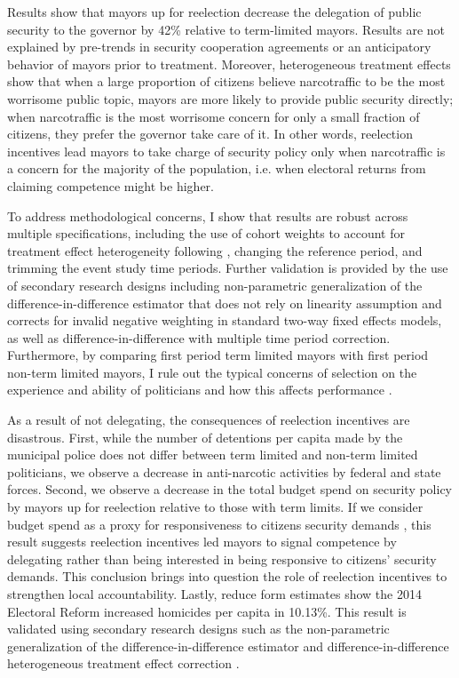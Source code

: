 \documentclass[12pt]{amsart}
\numberwithin{equation}{section}
\theoremstyle{definition}
\theoremstyle{definition}
\theoremstyle{definition}
\begin{document}
Results show that mayors up for reelection decrease the delegation of public security to the governor by 42\% relative to term-limited mayors. Results are not explained by pre-trends in security cooperation agreements or an anticipatory behavior of mayors prior to treatment. Moreover, heterogeneous treatment effects show that when a large proportion of citizens believe narcotraffic to be the most worrisome public topic, mayors are more likely to provide public security directly; when narcotraffic is the most worrisome concern for only a small fraction of citizens, they prefer the governor take care of it. In other words, reelection incentives lead mayors to take charge of security policy only when narcotraffic is a concern for the majority of the population, i.e. when electoral returns from claiming competence might be higher.  

To address methodological concerns, I show that results are robust across multiple specifications, including the use of cohort weights to account for treatment effect heterogeneity following \citet{abraham_sun_2020}, changing the reference period, and trimming the event study time periods. Further validation is provided by the use of secondary research designs including \citet{imai_etal_2020} non-parametric generalization of the difference-in-difference estimator that does not rely on linearity assumption and corrects for invalid negative weighting in standard two-way fixed effects models, as well as \citet{chaisemarting_etal_2019} difference-in-difference with multiple time period correction. Furthermore, by comparing first period term limited mayors with first period non-term limited mayors, I rule out the typical concerns of selection on the experience and ability of politicians \citep{samuelson_1984, dalbo_etal_2017} and how this affects performance \citep{ferraz_finan_2011}. 

As a result of not delegating, the consequences of reelection incentives are disastrous. First, while the number of detentions per capita made by the municipal police does not differ between term limited and non-term limited politicians, we observe a decrease in anti-narcotic activities by federal and state forces. Second, we observe a decrease in the total budget spend on security policy by mayors up for reelection relative to those with term limits. If we consider budget spend as a proxy for responsiveness to citizens security demands \citep{carreri_2020}, this result suggests reelection incentives led mayors to signal competence by delegating rather than being interested in being responsive to citizens' security demands. This conclusion brings into question the role of reelection incentives to strengthen local accountability. Lastly, reduce form estimates show the 2014 Electoral Reform increased homicides per capita in 10.13\%. This result is validated using secondary research designs such as the non-parametric generalization of the difference-in-difference estimator \citep{imai_etal_2020} and difference-in-difference heterogeneous treatment effect correction \citep{chaisemarting_etal_2019}.       
\end{document}
